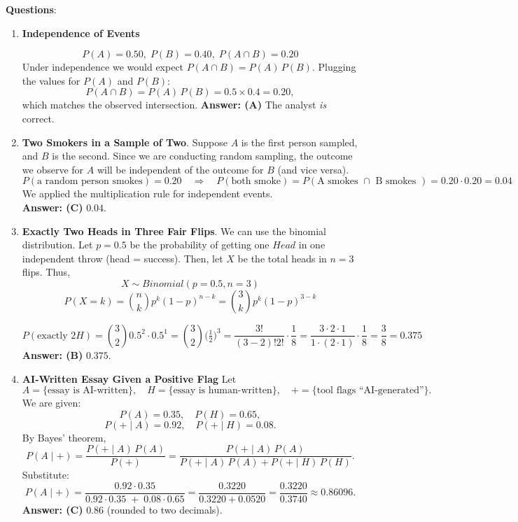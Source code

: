 \documentclass{article}
\begin{document}
\textbf{Questions}:
\begin{enumerate}
  \item \textbf{Independence of Events}

        \[
          P(A)=0.50,\;P(B)=0.40,\;P(A\cap B)=0.20
        \]
        Under independence we would expect $P(A\cap B)=P(A)\,P(B)$. Plugging the values for $P(A)$ and $P(B)$:
        \[
          P(A\cap B)=P(A)\,P(B)=0.5\times0.4=0.20,
        \]
        which matches the observed intersection.
        \textbf{Answer: (A)} The analyst \emph{is} correct.

  \item \textbf{Two Smokers in a Sample of Two}.  Suppose $A$ is the first person sampled, and $B$ is the second. Since we are conducting random sampling, the outcome we observe for $A$ will be independent of the outcome for $B$ (and vice versa).
        \[
          P(\text{a random person smokes}) = 0.20 \quad\Longrightarrow\quad
          P(\text{both smoke}) = P(\text{A smokes } \cap \text{ B smokes } ) = 0.20\cdot 0.20 = 0.04
        \]
        We applied the multiplication rule for independent events. \\
        \textbf{Answer: (C)} \(0.04\).

  \item \textbf{Exactly Two Heads in Three Fair Flips}. We can use the binomial distribution. Let $p=0.5$ be the probability of getting one $Head$ in one independent throw (head = success). Then, let $X$ be the total heads in $n=3$ flips. Thus,
  $$ X \sim Binomial(p=0.5, n=3)$$
  $$P(X=k)=\binom{n}{k}p^k (1-p)^{n-k}=\binom{3}{k}p^k (1-p)^{3-k}$$

        \[
          P(\text{exactly }2H)=\binom{3}{2}0.5^2 \cdot 0.5^1 =\binom{3}{2}\bigl(\tfrac12\bigr)^3
          =  \frac{3!}{(3-2)! 2!} \cdot \frac{1}{8}
          = \frac{3\cdot 2 \cdot 1}{1 \cdot (2 \cdot 1)} \cdot \frac{1}{8}
          =\frac{3}{8}=0.375
        \]
        \textbf{Answer: (B)} \(0.375\).

\item \textbf{AI‐Written Essay Given a Positive Flag}
Let
\[
A = \{\text{essay is AI‐written}\},\quad
H = \{\text{essay is human‐written}\},\quad
+ = \{\text{tool flags ``AI‐generated''}\}.
\]
We are given:
\[
P(A)=0.35,\quad P(H)=0.65,
\]
\[
P(+\mid A)=0.92,\quad P(+\mid H)=0.08.
\]
By Bayes’ theorem,
\[
P(A\mid+)
=\frac{P(+\mid A)\,P(A)}{P(+)}
=\frac{P(+\mid A)\,P(A)}{P(+\mid A)\,P(A)+P(+\mid H)\,P(H)}.
\]
Substitute:
\[
P(A\mid+)
=\frac{0.92\cdot0.35}{0.92\cdot0.35 \;+\; 0.08\cdot0.65}
=\frac{0.3220}{0.3220+0.0520}
=\frac{0.3220}{0.3740}
\approx0.86096.
\]
\textbf{Answer: (C)} \(0.86\) (rounded to two decimals).

\end{enumerate}
\end{document}
